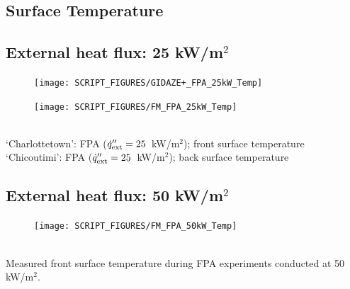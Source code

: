 \documentclass{book}
\begin{document}
\begin{landscape}
\newpage
\section{Surface Temperature}
\label{Gas_Temp}
\subsection{External heat flux: 25 kW/m$^2$}
\begin{minipage}{0.65\textwidth}
\begin{figure}[H]
{\texttt{[image: SCRIPT\_FIGURES/GIDAZE+\_FPA\_25kW\_Temp]}}\\
\end{figure}
\end{minipage}

\begin{minipage}{0.35\textwidth}
\begin{figure}[H]
{\texttt{[image: SCRIPT\_FIGURES/FM\_FPA\_25kW\_Temp]}}\\
\end{figure}
\end{minipage}\\
‘Charlottetown’:  FPA ($\dot{q}_{\rm ext}'' = 25$~kW/m$^2$); front surface temperature \\
‘Chicoutimi’:   FPA ($\dot{q}_{\rm ext}'' = 25$~kW/m$^2$); back surface temperature \\
\vfill


\newpage
\subsection{External heat flux: 50 kW/m$^2$}
\begin{minipage}{0.65\textwidth}
\begin{figure}[H]
{\texttt{[image: SCRIPT\_FIGURES/FM\_FPA\_50kW\_Temp]}}\\
\end{figure}
\end{minipage}\\
Measured front surface temperature during FPA experiments conducted at 50 kW/m$^2$. 
\vfill
\newpage

\end{landscape}
\end{document}
